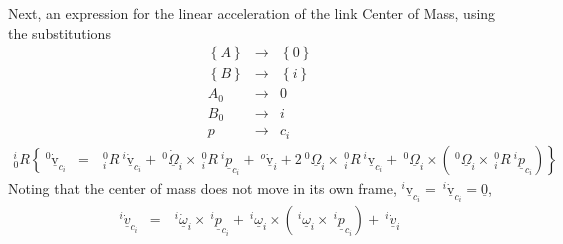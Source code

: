 \documentclass[fleqn]{article}
\begin{document}
Next, an expression for the linear acceleration of the link Center of Mass, using the substitutions
\begin{eqnarray}
	\left\{ A \right\} & \rightarrow & \left\{ 0 \right\} \nonumber \\
	\left\{ B \right\} & \rightarrow & \left\{ i \right\} \nonumber \\
	A_{0} & \rightarrow & 0 \nonumber \\
	B_{0} & \rightarrow & i \nonumber \\
	p & \rightarrow & c_{i} \nonumber
\end{eqnarray}
\begin{eqnarray}
^{i}_{0}R\left\{\ ^{0}\underline{\dot{\mathrm{v}}}_{c_{i}} \right. & = & \left. \ ^{0}_{i}R\ ^{i}\underline{\dot{\mathrm{v}}}_{c_{i}} + \ ^{0}\underline{\dot{\Omega}}_{i}\times\ ^{0}_{i}R\ ^{i}\underline{p}_{c_{i}}+\ ^{o}\underline{\dot{\mathrm{v}}}_{i} + 2\ ^{0}\underline{\Omega}_{i}\times\ ^{0}_{i}R\ ^{i}\underline{\mathrm{v}}_{c_{i}} + \ ^{0}\underline{\Omega}_{i}\times (\ ^{0}\underline{\Omega}_{i}\times\ ^{0}_{i}R\  ^{i}\underline{p}_{c_{i}}) \right\} \nonumber
\end{eqnarray}
Noting that the center of mass does not move in its own frame, $^{i}\underline{\mathrm{v}}_{c_{i}} = \ ^{i}\underline{\dot{\mathrm{v}}}_{c_{i}} = \underline{0}$, 
\begin{eqnarray}
^{i}\dot{\underline{v}}_{c_{i}} & = & \ ^{i}\dot{\underline{\omega}}_{i} \times \ ^{i}\underline{p}_{c_{i}}+ \ ^{i}\underline{\omega}_{i}\times\left(\ ^{i}\underline{\omega}_{i}\times\ ^{i}\underline{p}_{c_{i}}\right) + \ ^{i}\underline{\dot{v}}_{i} \nonumber
\end{eqnarray}
\end{document}
